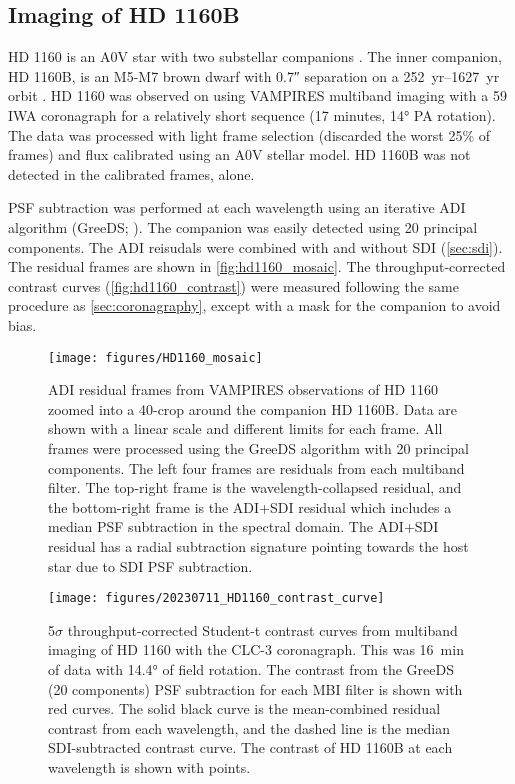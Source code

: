 
\subsection{Imaging of HD 1160B\label{sec:hd1160}}

HD 1160 is an A0V star with two substellar companions \citep{nielsen_gemini_2012,maire_first_2016,garcia_scexao_2017,mesa_characterizing_2020}. The inner companion, HD 1160B, is an M5-M7 brown dwarf with \ang{;;0.7} separation on a \SIrange{252}{1627}{yr} orbit \citep{blunt_orbits_2017}. HD 1160 was observed on  using VAMPIRES multiband imaging with a \SI{59}{\mas} IWA coronagraph for a relatively short sequence (17 minutes, \ang{14} PA rotation). The data was processed with light frame selection (discarded the worst 25\% of frames) and flux calibrated using an A0V stellar model. HD 1160B was not detected in the calibrated frames, alone.

PSF subtraction was performed at each wavelength using an iterative ADI algorithm (GreeDS; \citealt{pairet_reference-less_2019,pairet_mayonnaise_2020,stapper_iterative_2022}). The companion was easily detected using 20 principal components. The ADI reisudals were combined with and without SDI (\autoref{sec:sdi}). The residual frames are shown in \autoref{fig:hd1160_mosaic}. The throughput-corrected contrast curves (\autoref{fig:hd1160_contrast}) were measured following the same procedure as \autoref{sec:coronagraphy}, except with a mask for the companion to avoid bias.

\begin{figure*}[t]
    \centering
    \texttt{[image: figures/HD1160\_mosaic]}
    \caption{ADI residual frames from VAMPIRES observations of HD 1160 zoomed into a \SI{40}{\pixel}-crop around the companion HD 1160B. Data are shown with a linear scale and different limits for each frame. All frames were processed using the GreeDS algorithm with 20 principal components. The left four frames are residuals from each multiband filter. The top-right frame is the wavelength-collapsed residual, and the bottom-right frame is the ADI+SDI residual which includes a median PSF subtraction in the spectral domain. The ADI+SDI residual has a radial subtraction signature pointing towards the host star due to SDI PSF subtraction.\label{fig:hd1160_mosaic}}
\end{figure*}

\begin{figure}
    \centering
    \texttt{[image: figures/20230711\_HD1160\_contrast\_curve]}
    \caption{5$\sigma$ throughput-corrected Student-t contrast curves from multiband imaging of HD 1160 with the CLC-3 coronagraph. This was \SI{16}{\minute} of data with \ang{14.4} of field rotation. The contrast from the GreeDS (20 components) PSF subtraction for each MBI filter is shown with red curves. The solid black curve is the mean-combined residual contrast from each wavelength, and the dashed line is the median SDI-subtracted contrast curve. The contrast of HD 1160B at each wavelength is shown with points.\label{fig:hd1160_contrast}}
\end{figure}

